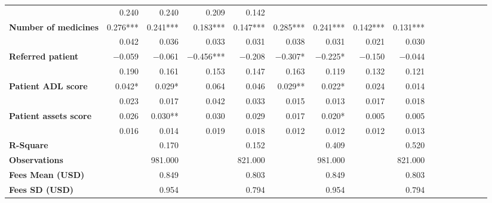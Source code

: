 \begin{tabular}{@{\extracolsep{5pt}}lrrrrrrrrrrrrrrr}
{\bf } & 0.240\phantom{***} & 0.240\phantom{***} & 0.209\phantom{***} & 0.142\phantom{***} & \phantom{***} & \phantom{***} & \phantom{***} & \phantom{***} \\
{\bf Number of medicines} & 0.276*** & 0.241*** & 0.183*** & 0.147*** & 0.285*** & 0.241*** & 0.142*** & 0.131*** \\
{\bf } & 0.042\phantom{***} & 0.036\phantom{***} & 0.033\phantom{***} & 0.031\phantom{***} & 0.038\phantom{***} & 0.031\phantom{***} & 0.021\phantom{***} & 0.030\phantom{***} \\
{\bf Referred patient} & $-$0.059\phantom{***} & $-$0.061\phantom{***} & $-$0.456*** & $-$0.208\phantom{***} & $-$0.307*\phantom{**} & $-$0.225*\phantom{**} & $-$0.150\phantom{***} & $-$0.044\phantom{***} \\
{\bf } & 0.190\phantom{***} & 0.161\phantom{***} & 0.153\phantom{***} & 0.147\phantom{***} & 0.163\phantom{***} & 0.119\phantom{***} & 0.132\phantom{***} & 0.121\phantom{***} \\
{\bf Patient ADL score} & 0.042*\phantom{**} & 0.029*\phantom{**} & 0.064\phantom{***} & 0.046\phantom{***} & 0.029**\phantom{*} & 0.022*\phantom{**} & 0.024\phantom{***} & 0.014\phantom{***} \\
{\bf } & 0.023\phantom{***} & 0.017\phantom{***} & 0.042\phantom{***} & 0.033\phantom{***} & 0.015\phantom{***} & 0.013\phantom{***} & 0.017\phantom{***} & 0.018\phantom{***} \\
{\bf Patient assets score} & 0.026\phantom{***} & 0.030**\phantom{*} & 0.030\phantom{***} & 0.029\phantom{***} & 0.017\phantom{***} & 0.020*\phantom{**} & 0.005\phantom{***} & 0.005\phantom{***} \\
{\bf } & 0.016\phantom{***} & 0.014\phantom{***} & 0.019\phantom{***} & 0.018\phantom{***} & 0.012\phantom{***} & 0.012\phantom{***} & 0.012\phantom{***} & 0.013\phantom{***} \\
{\bf R-Square} & \phantom{***} & 0.170\phantom{***} & \phantom{***} & 0.152\phantom{***} & \phantom{***} & 0.409\phantom{***} & \phantom{***} & 0.520\phantom{***} \\
{\bf Observations} & \phantom{***} & 981.000\phantom{***} & \phantom{***} & 821.000\phantom{***} & \phantom{***} & 981.000\phantom{***} & \phantom{***} & 821.000\phantom{***} \\
{\bf Fees Mean (USD)} & \phantom{***} & 0.849\phantom{***} & \phantom{***} & 0.803\phantom{***} & \phantom{***} & 0.849\phantom{***} & \phantom{***} & 0.803\phantom{***} \\
{\bf Fees SD (USD)} & \phantom{***} & 0.954\phantom{***} & \phantom{***} & 0.794\phantom{***} & \phantom{***} & 0.954\phantom{***} & \phantom{***} & 0.794\phantom{***} \\
\hline
\end{tabular}
